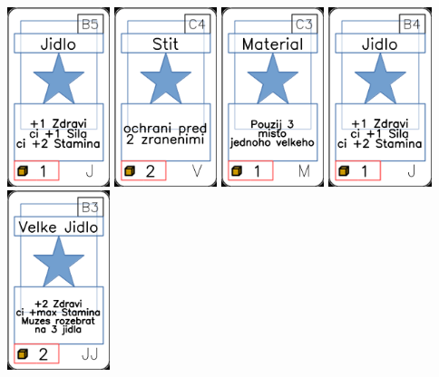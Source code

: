 \documentclass[a4paper]{article}
\begin{document}
	\includegraphics[width=3.0cm]{img-1_9}
	\includegraphics[width=3.0cm]{img-1_73}
	\includegraphics[width=3.0cm]{img-1_42}
	\includegraphics[width=3.0cm]{img-1_8}
	\includegraphics[width=3.0cm]{img-1_37}
\end{document}
